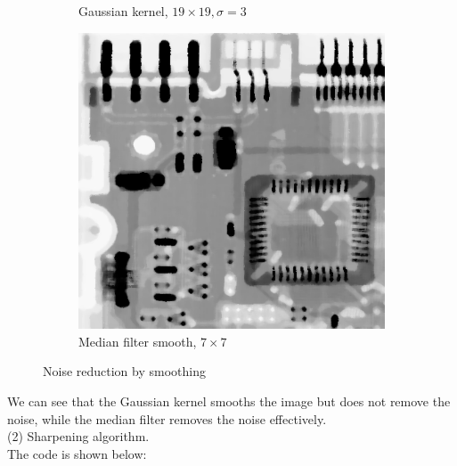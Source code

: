 \documentclass[UTF8]{ctexart}
\begin{document}
\begin{figure}[htbp]
\begin{subfigure}{0.3\textwidth}
        \caption{Gaussian kernel, $19\times19,\sigma = 3$}
    \end{subfigure}%
    \hfill
    \begin{subfigure}{0.3\textwidth}
        \centering
        \includegraphics[width=\linewidth]{ckt_median_smooth.png}
        \caption{Median filter smooth, $7\times7$}
    \end{subfigure}

    \caption{Noise reduction by smoothing}
\end{figure}
\newpage
We can see that the Gaussian kernel smooths the image but does not remove the noise, while the median filter removes the noise effectively.\\
(2) Sharpening algorithm.\\
The code is shown below:
\end{document}

